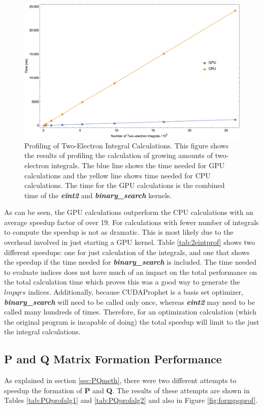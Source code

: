 \documentclass[12pt]{report}
\newcommand{\kernel}[1]{\textit{\textbf{#1}}}
\begin{document}
\begin{figure}[h!]
\includegraphics[width=1\textwidth]{Figures/eint2prof.png}
\caption[Profiling of Two-Electron Integral Calculations]
{Profiling of Two-Electron Integral Calculations. This figure shows the results of profiling the calculation of growing amounts of two-electron integrals. The blue line shows the time needed for GPU calculations and the yellow line shows time needed for CPU calculations. The time for the GPU calculations is the combined time of the \kernel{eint2} and \kernel{binary\_search} kernels.}
\label{fig:2eintprof}
\end{figure}

As can be seen, the GPU calculations outperform the CPU calculations with an average speedup factor of over 19. For calculations with fewer number of integrals to compute the speedup is not as dramatic. This is most likely due to the overhead involved in just starting a GPU kernel. Table \ref{tab:2eintprof} shows two different speedups: one for just calculation of the integrals, and one that shows the speedup if the time needed for \kernel{binary\_search} is included. The time needed to evaluate indices does not have much of an impact on the total performance on the total calculation time which proves this was a good way to generate the $lmpqrs$ indices. Additionally, because CUDAProphet is a basis set optimizer, \kernel{binary\_search} will need to be called only once, whereas \kernel{eint2} may need to be called many hundreds of times. Therefore, for an optimization calculation (which the original program is incapable of doing) the total speedup will limit to the just the integral calculations.

\subsection{P and Q Matrix Formation Performance}
As explained in section \ref{sec:PQmeth}, there were two different attempts to speedup the formation of \textbf{P} and \textbf{Q}. The results of these attempts are shown in Tables \ref{tab:PQprofalg1} and \ref{tab:PQprofalg2} and also in Figure \ref{fig:formpqprof}.
\end{document}
